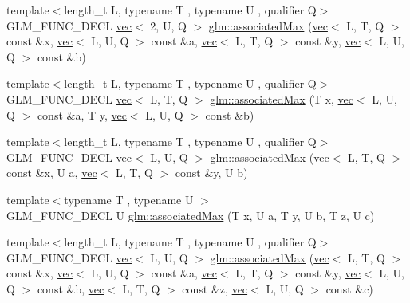 \begin{DoxyCompactItemize}
\item 
{\footnotesize template$<$length\+\_\+t L, typename T , typename U , qualifier Q$>$ }\\G\+L\+M\+\_\+\+F\+U\+N\+C\+\_\+\+D\+E\+CL \hyperlink{structglm_1_1vec}{vec}$<$ 2, U, Q $>$ \hyperlink{group__gtx__associated__min__max_ga5c6758bc50aa7fbe700f87123a045aad}{glm\+::associated\+Max} (\hyperlink{structglm_1_1vec}{vec}$<$ L, T, Q $>$ const \&x, \hyperlink{structglm_1_1vec}{vec}$<$ L, U, Q $>$ const \&a, \hyperlink{structglm_1_1vec}{vec}$<$ L, T, Q $>$ const \&y, \hyperlink{structglm_1_1vec}{vec}$<$ L, U, Q $>$ const \&b)
\item 
{\footnotesize template$<$length\+\_\+t L, typename T , typename U , qualifier Q$>$ }\\G\+L\+M\+\_\+\+F\+U\+N\+C\+\_\+\+D\+E\+CL \hyperlink{structglm_1_1vec}{vec}$<$ L, T, Q $>$ \hyperlink{group__gtx__associated__min__max_ga0d169d6ce26b03248df175f39005d77f}{glm\+::associated\+Max} (T x, \hyperlink{structglm_1_1vec}{vec}$<$ L, U, Q $>$ const \&a, T y, \hyperlink{structglm_1_1vec}{vec}$<$ L, U, Q $>$ const \&b)
\item 
{\footnotesize template$<$length\+\_\+t L, typename T , typename U , qualifier Q$>$ }\\G\+L\+M\+\_\+\+F\+U\+N\+C\+\_\+\+D\+E\+CL \hyperlink{structglm_1_1vec}{vec}$<$ L, U, Q $>$ \hyperlink{group__gtx__associated__min__max_ga4086269afabcb81dd7ded33cb3448653}{glm\+::associated\+Max} (\hyperlink{structglm_1_1vec}{vec}$<$ L, T, Q $>$ const \&x, U a, \hyperlink{structglm_1_1vec}{vec}$<$ L, T, Q $>$ const \&y, U b)
\item 
{\footnotesize template$<$typename T , typename U $>$ }\\G\+L\+M\+\_\+\+F\+U\+N\+C\+\_\+\+D\+E\+CL U \hyperlink{group__gtx__associated__min__max_gaec891e363d91abbf3a4443cf2f652209}{glm\+::associated\+Max} (T x, U a, T y, U b, T z, U c)
\item 
{\footnotesize template$<$length\+\_\+t L, typename T , typename U , qualifier Q$>$ }\\G\+L\+M\+\_\+\+F\+U\+N\+C\+\_\+\+D\+E\+CL \hyperlink{structglm_1_1vec}{vec}$<$ L, U, Q $>$ \hyperlink{group__gtx__associated__min__max_gab84fdc35016a31e8cd0cbb8296bddf7c}{glm\+::associated\+Max} (\hyperlink{structglm_1_1vec}{vec}$<$ L, T, Q $>$ const \&x, \hyperlink{structglm_1_1vec}{vec}$<$ L, U, Q $>$ const \&a, \hyperlink{structglm_1_1vec}{vec}$<$ L, T, Q $>$ const \&y, \hyperlink{structglm_1_1vec}{vec}$<$ L, U, Q $>$ const \&b, \hyperlink{structglm_1_1vec}{vec}$<$ L, T, Q $>$ const \&z, \hyperlink{structglm_1_1vec}{vec}$<$ L, U, Q $>$ const \&c)

\end{DoxyCompactItemize}
